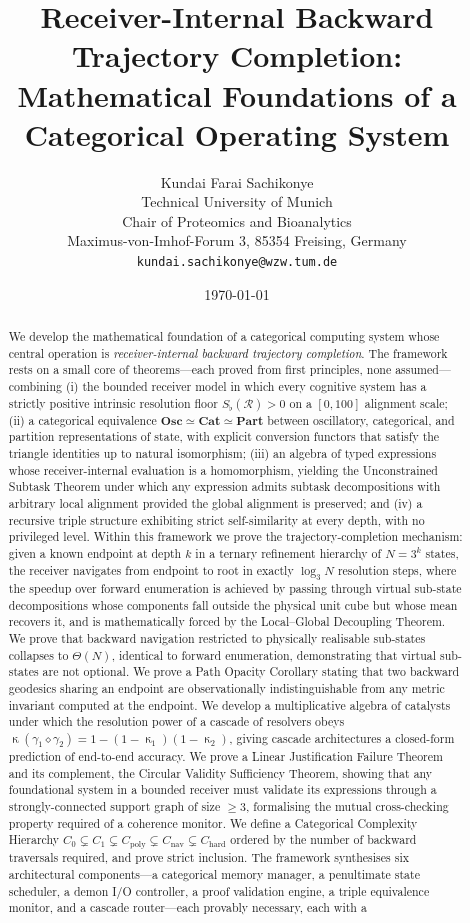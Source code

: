 \documentclass[twocolumn,a4paper]{article}
\title{\textbf{Receiver-Internal Backward Trajectory Completion:\\[3pt]
Mathematical Foundations of a Categorical Operating System}}
\author{
Kundai Farai Sachikonye\\
Technical University of Munich\\
Chair of Proteomics and Bioanalytics\\
Maximus-von-Imhof-Forum 3, 85354 Freising, Germany\\
\texttt{kundai.sachikonye@wzw.tum.de}
}
\date{\today}
\DeclareMathOperator{\catpow}{\kappa}
\newcommand{\receiver}{\mathcal{R}}
\newcommand{\Sfloor}{S_{\flat}}
\begin{document}
\maketitle

\begin{abstract}
We develop the mathematical foundation of a categorical computing system whose central operation is \emph{receiver-internal backward trajectory completion}. The framework rests on a small core of theorems---each proved from first principles, none assumed---combining (i) the bounded receiver model in which every cognitive system has a strictly positive intrinsic resolution floor $\Sfloor(\receiver)>0$ on a $[0,100]$ alignment scale; (ii) a categorical equivalence $\mathbf{Osc}\simeq\mathbf{Cat}\simeq\mathbf{Part}$ between oscillatory, categorical, and partition representations of state, with explicit conversion functors that satisfy the triangle identities up to natural isomorphism; (iii) an algebra of typed expressions whose receiver-internal evaluation is a homomorphism, yielding the Unconstrained Subtask Theorem under which any expression admits subtask decompositions with arbitrary local alignment provided the global alignment is preserved; and (iv) a recursive triple structure exhibiting strict self-similarity at every depth, with no privileged level. Within this framework we prove the trajectory-completion mechanism: given a known endpoint at depth $k$ in a ternary refinement hierarchy of $N=3^{k}$ states, the receiver navigates from endpoint to root in exactly $\log_{3} N$ resolution steps, where the speedup over forward enumeration is achieved by passing through virtual sub-state decompositions whose components fall outside the physical unit cube but whose mean recovers it, and is mathematically forced by the Local--Global Decoupling Theorem. We prove that backward navigation restricted to physically realisable sub-states collapses to $\Theta(N)$, identical to forward enumeration, demonstrating that virtual sub-states are not optional. We prove a Path Opacity Corollary stating that two backward geodesics sharing an endpoint are observationally indistinguishable from any metric invariant computed at the endpoint. We develop a multiplicative algebra of catalysts under which the resolution power of a cascade of resolvers obeys $\catpow(\gamma_{1}\diamond\gamma_{2})=1-(1-\catpow_{1})(1-\catpow_{2})$, giving cascade architectures a closed-form prediction of end-to-end accuracy. We prove a Linear Justification Failure Theorem and its complement, the Circular Validity Sufficiency Theorem, showing that any foundational system in a bounded receiver must validate its expressions through a strongly-connected support graph of size $\geq 3$, formalising the mutual cross-checking property required of a coherence monitor. We define a Categorical Complexity Hierarchy $C_{0}\subsetneq C_{1}\subsetneq C_{\text{poly}}\subsetneq C_{\text{nav}}\subsetneq C_{\text{hard}}$ ordered by the number of backward traversals required, and prove strict inclusion. The framework synthesises six architectural components---a categorical memory manager, a penultimate state scheduler, a demon I/O controller, a proof validation engine, a triple equivalence monitor, and a cascade router---each provably necessary, each with a 
\end{abstract}
\end{document}
